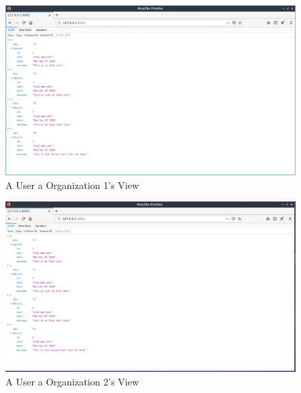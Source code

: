 			\begin{figure}[H]
		\includegraphics[width=.9\textwidth]{./fabsec-report-network-flow/network-flow-21.jpg}
		\caption{A User a Organization 1's View}
		\end{figure}	
		
		\begin{figure}[H]
		\includegraphics[width=.9\textwidth]{./fabsec-report-network-flow/network-flow-22.jpg}
		\caption{A User a Organization 2's View}
		\end{figure}	
		
